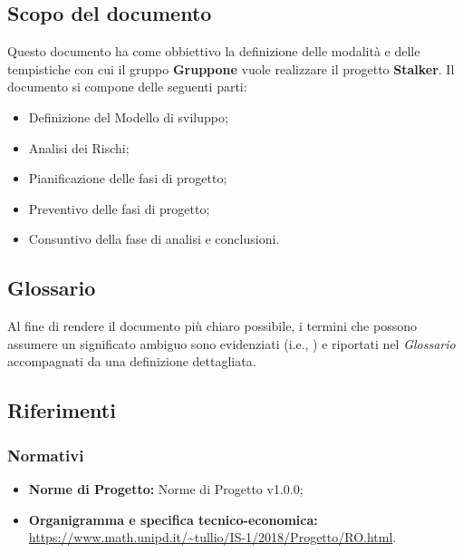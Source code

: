 \documentclass[../piano-di-progetto.tex]{subfiles}
\begin{document}
\subsection{Scopo del documento}%
\label{sub:scopo_del_documento}
Questo documento ha come obbiettivo la definizione delle modalità e delle tempistiche con cui il gruppo \textbf{Gruppone} vuole realizzare il progetto \textbf{Stalker}.
Il documento si compone delle seguenti parti:
\begin{itemize}
  \item Definizione del Modello di sviluppo;
  \item Analisi dei Rischi;
  \item Pianificazione delle fasi di progetto;
  \item Preventivo delle fasi di progetto;
  \item Consuntivo della fase di analisi e conclusioni.
\end{itemize}
\subsection{Glossario}%
\label{sub:glossario}
Al fine di rendere il documento più chiaro possibile, i termini che possono assumere un significato ambiguo sono evidenziati (i.e., ) e riportati nel \textit{Glossario} accompagnati da una definizione dettagliata.
\subsection{Riferimenti}%
\label{sub:riferimenti}
\subsubsection{Normativi}%
\label{subs:normativi}
\begin{itemize}
  \item  \textbf{Norme di Progetto:} Norme di Progetto v1.0.0;
  \item  \textbf{Organigramma e specifica tecnico-economica:} \url{https://www.math.unipd.it/~tullio/IS-1/2018/Progetto/RO.html}.
\end{itemize}
\end{document}
